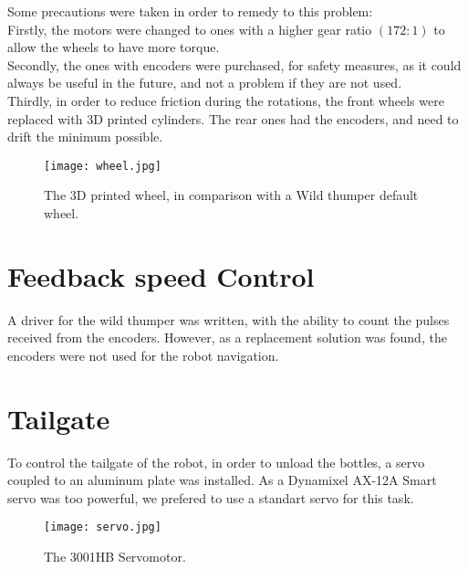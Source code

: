 Some precautions were taken in order to remedy to this problem:\\

Firstly, the motors were changed to ones with a higher gear ratio $(172:1)$ to allow the wheels to have more torque.\\

Secondly, the ones with encoders were purchased, for safety measures, as it could always be useful in the future, and not a problem if they are not used. \\

Thirdly, in order to reduce friction during the rotations, the front wheels were replaced with 3D printed cylinders. The rear ones had the encoders, and need to drift the minimum possible. \\

\begin{figure}[H]
  \centering
  \texttt{[image: wheel.jpg]}
  \caption{The 3D printed wheel, in comparison with a Wild thumper default wheel.}
\label{fig:wheel}
\end{figure}


\section{Feedback speed Control}
A driver for the wild thumper was written, with the ability to count the pulses received from the encoders. However, as a replacement solution was found, the encoders were not used for the robot navigation.

\section{Tailgate}

To control the tailgate of the robot, in order to unload the bottles, a servo coupled to an aluminum plate was installed. 
As a Dynamixel AX-12A Smart servo was too powerful, we prefered to use a standart servo for this task.

\begin{figure}[H]
  \centering
  \texttt{[image: servo.jpg]}
  \caption{The 3001HB Servomotor.}
\label{fig:servo}
\end{figure}

